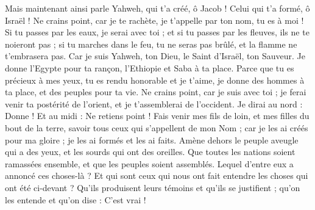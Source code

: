 \begin{multicols}{2}
\VerseOne{}Mais maintenant ainsi parle Yahweh, qui t'a créé, ô Jacob ! Celui qui t'a formé, ô Israël ! Ne crains point, car je te rachète, je t'appelle par ton nom, tu es à moi !
Si tu passes par les eaux, je serai avec toi ; et si tu passes par les fleuves, ils ne te noieront pas ; si tu marches dans le feu, tu ne seras pas brûlé, et la flamme ne t'embrasera pas.
Car je suis Yahweh, ton Dieu, le Saint d'Israël, ton Sauveur. Je donne l'Egypte pour ta rançon, l'Ethiopie et Saba à ta place.
Parce que tu es précieux à mes yeux, tu es rendu honorable et je t'aime, je donne des hommes à ta place, et des peuples pour ta vie.
Ne crains point, car je suis avec toi ; je ferai venir ta postérité de l'orient, et je t'assemblerai de l'occident.
Je dirai au nord : Donne ! Et au midi : Ne retiens point ! Fais venir mes fils de loin, et mes filles du bout de la terre,
savoir tous ceux qui s'appellent de mon Nom ; car je les ai créés pour ma gloire ; je les ai formés et les ai faits.
Amène dehors le peuple aveugle qui a des yeux, et les sourds qui ont des oreilles.
Que toutes les nations soient ramassées ensemble, et que les peuples soient assemblés. Lequel d'entre eux a annoncé ces choses-là ? Et qui sont ceux qui nous ont fait entendre les choses qui ont été ci-devant ? Qu'ils produisent leurs témoins et qu'ils se justifient ; qu'on les entende et qu'on dise : C'est vrai !

\end{multicols}

